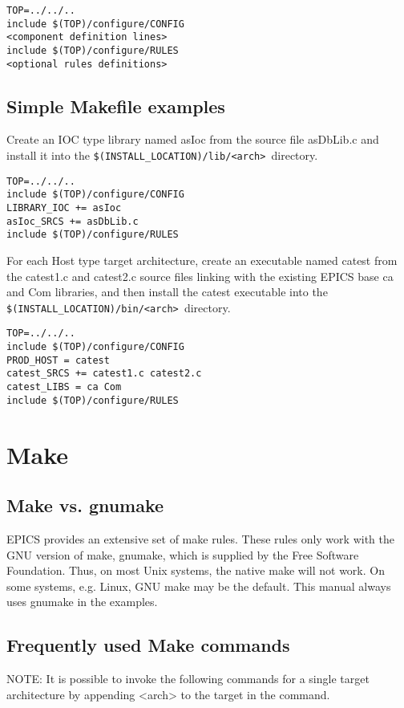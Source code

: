 \begin{verbatim}TOP=../../..
include $(TOP)/configure/CONFIG
<component definition lines>
include $(TOP)/configure/RULES
<optional rules definitions>
\end{verbatim}\subsection{Simple Makefile examples}

Create an IOC type library named asIoc from the source file asDbLib.c and install it into the 
\verb|$(INSTALL_LOCATION)/lib/<arch> |directory.

\begin{verbatim}TOP=../../..
include $(TOP)/configure/CONFIG
LIBRARY_IOC += asIoc
asIoc_SRCS += asDbLib.c
include $(TOP)/configure/RULES
\end{verbatim}For each Host type target architecture, create an executable named catest from the catest1.c and catest2.c source files 
linking with the existing EPICS base ca and Com libraries, and then install the catest executable into the 
\verb|$(INSTALL_LOCATION)/bin/<arch> |directory.

\begin{verbatim}TOP=../../..
include $(TOP)/configure/CONFIG
PROD_HOST = catest
catest_SRCS += catest1.c catest2.c
catest_LIBS = ca Com
include $(TOP)/configure/RULES
\end{verbatim}\section{Make}

\subsection{Make vs. gnumake}

EPICS provides an extensive set of make rules. These rules only work with the GNU version of make, gnumake, which is 
supplied by the Free Software Foundation. Thus, on most Unix systems, the native make will not work. On some systems, 
e.g. Linux, GNU make may be the default. This manual always uses gnumake in the examples. 

\subsection{Frequently used Make commands }

NOTE: It is possible to invoke the following commands for a single target architecture by appending \textless{}arch\textgreater{} to the target 
in the command. 

